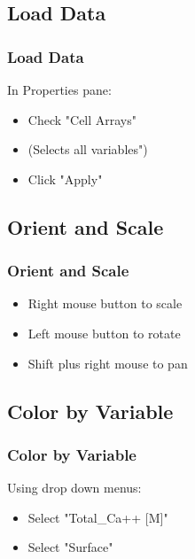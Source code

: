 \documentclass{beamer}
\begin{document}
\subsection{Load Data}

\begin{frame}[fragile]\frametitle{Load Data}
In Properties pane:
\begin{itemize}
  \item Check "Cell Arrays"
  \item (Selects all variables")
  \item Click "Apply"
\end{itemize}

\end{frame}

\subsection{Orient and Scale}

\begin{frame}[fragile]\frametitle{Orient and Scale}

\begin{itemize}
  \item Right mouse button to scale
  \item Left mouse button to rotate
  \item Shift plus right mouse to pan
\end{itemize}

\end{frame}

\subsection{Color by Variable}

\begin{frame}[fragile]\frametitle{Color by Variable}
Using drop down menus:
\begin{itemize}
  \item Select "Total\_Ca++ [M]"
  \item Select "Surface"
\end{itemize}

\end{frame}

\end{document}
